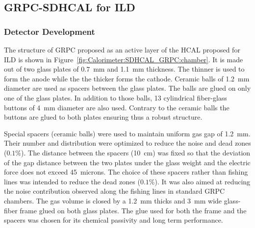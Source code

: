 \subsection{GRPC-SDHCAL for ILD}
\subsubsection{Detector Development}

The structure
of GRPC proposed as an active layer of the HCAL proposed for ILD is shown in
Figure~\ref{fig:Calorimeter:SDHCAL_GRPC:chamber}. It is made out of two glass plates of \SI{0.7}{mm} and \SI{1.1}{mm}
thickness. The thinner is used to form the anode while the the thicker forms
the cathode. Ceramic balls of \SI{1.2}{mm} diameter are used as spacers between the
glass plates. The balls are glued on only one of the glass plates. In
addition to those balls, 13 cylindrical fiber-glass buttons of \SI{4}{mm} diameter
are also used. Contrary to the ceramic balls the buttons are glued to both
plates ensuring thus a robust structure.

Special spacers (ceramic balls) were used to maintain uniform gas gap of \SI{1.2}{mm}.
Their number and distribution were optimized to reduce the noise and dead
zones ($0.1 \%$). The distance between the spacers (\SI{10}{cm}) was fixed so that
the deviation of the gap distance between the two plates under the glass weight
and the electric force does not exceed \SI{45}{microns}. The choice of these spacers
rather than fishing lines was intended to reduce the dead zones ($0.1 \%$). It
was also aimed at reducing the noise contribution observed along the fishing
lines in standard GRPC chambers. The gas volume is closed by a \SI{1.2}{mm} thicks
and \SI{3}{mm} wide glass-fiber frame glued on both glass plates. The glue used for
both the frame and the spacers was chosen for its chemical passivity and long
term performance.

